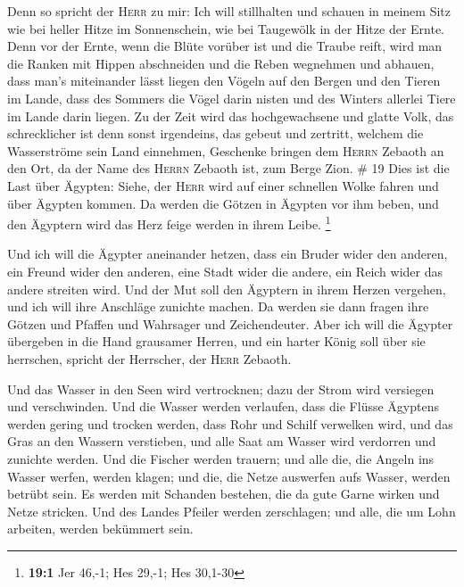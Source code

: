  Denn so spricht der \textsc{Herr} zu mir: Ich will
stillhalten und schauen in meinem Sitz wie bei heller Hitze im
Sonnenschein, wie bei Taugewölk in der Hitze der Ernte. 
Denn vor der Ernte, wenn die Blüte vorüber ist und die Traube reift,
wird man die Ranken mit Hippen abschneiden und die Reben wegnehmen und
abhauen,  dass man's miteinander lässt liegen den Vögeln
auf den Bergen und den Tieren im Lande, dass des Sommers die Vögel darin
nisten und des Winters allerlei Tiere im Lande darin liegen.
 Zu der Zeit wird das hochgewachsene und glatte Volk, das
schrecklicher ist denn sonst irgendeins, das gebeut und zertritt,
welchem die Wasserströme sein Land einnehmen, Geschenke bringen dem
\textsc{Herrn} Zebaoth an den Ort, da der Name des \textsc{Herrn}
Zebaoth ist, zum Berge Zion. \# 19  Dies ist die Last über
Ägypten: Siehe, der \textsc{Herr} wird auf einer schnellen Wolke fahren
und über Ägypten kommen. Da werden die Götzen in Ägypten vor ihm beben,
und den Ägyptern wird das Herz feige werden in ihrem Leibe. \footnote{\textbf{19:1}
  Jer 46,-1; Hes 29,-1; Hes 30,1-30}

 Und ich will die Ägypter aneinander hetzen, dass ein
Bruder wider den anderen, ein Freund wider den anderen, eine Stadt wider
die andere, ein Reich wider das andere streiten wird.  Und
der Mut soll den Ägyptern in ihrem Herzen vergehen, und ich will ihre
Anschläge zunichte machen. Da werden sie dann fragen ihre Götzen und
Pfaffen und Wahrsager und Zeichendeuter.  Aber ich will
die Ägypter übergeben in die Hand grausamer Herren, und ein harter König
soll über sie herrschen, spricht der Herrscher, der \textsc{Herr}
Zebaoth.

 Und das Wasser in den Seen wird vertrocknen; dazu der
Strom wird versiegen und verschwinden.  Und die Wasser
werden verlaufen, dass die Flüsse Ägyptens werden gering und trocken
werden, dass Rohr und Schilf verwelken wird,  und das Gras
an den Wassern verstieben, und alle Saat am Wasser wird verdorren und
zunichte werden.  Und die Fischer werden trauern; und alle
die, die Angeln ins Wasser werfen, werden klagen; und die, die Netze
auswerfen aufs Wasser, werden betrübt sein.  Es werden mit
Schanden bestehen, die da gute Garne wirken und Netze stricken.
 Und des Landes Pfeiler werden zerschlagen; und alle, die
um Lohn arbeiten, werden bekümmert sein.

